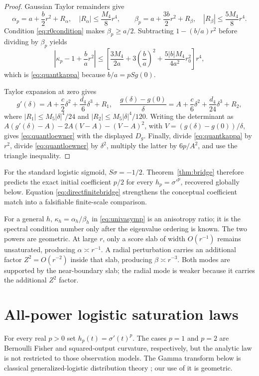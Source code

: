\documentclass[11pt]{article}
\begin{document}
\begin{proof}
Gaussian Taylor remainders give
\[
 \alpha_p=a+\frac b2r^2+R_\alpha,\quad |R_\alpha|\le\frac{M_4}{8}r^4,
 \qquad
 \beta_p=a+\frac{3b}{2}r^2+R_\beta,\quad |R_\beta|\le\frac{5M_4}{8}r^4.
\]
Condition \eqref{eq:r0condition} makes $\beta_p\ge a/2$.  Subtracting
$1-(b/a)r^2$ before dividing by $\beta_p$ yields
\[
 \left|\kappa_p-1+\frac ba r^2\right|
 \le\left[
 \frac{3M_4}{2a}+3\left(\frac ba\right)^2
 +\frac{5|b|M_4}{4a^2}r_0^2\right]r^4,
\]
which is \eqref{eq:quantkappa} because $b/a=pSg(0)$.

Taylor expansion at zero gives
\[
 g'(\delta)=A+\frac c2\delta^2+\frac{d_4}{6}\delta^3+R_1,\quad
 \frac{g(\delta)-g(0)}\delta
 =A+\frac c6\delta^2+\frac{d_4}{24}\delta^3+R_2,
\]
where $|R_1|\le M_5|\delta|^4/24$ and
$|R_2|\le M_5|\delta|^4/120$.  Writing the determinant as
$A(g'(\delta)-A)-2A(V-A)-(V-A)^2$, with
$V=(g(\delta)-g(0))/\delta$, gives \eqref{eq:quantloewner} with the displayed $D_g$.
Finally, divide \eqref{eq:quantkappa} by $r^2$, divide
\eqref{eq:quantloewner} by $\delta^2$, multiply the latter by $6p/A^2$, and use the triangle inequality.
\end{proof}

For the standard logistic sigmoid, $S\sigma=-1/2$.  Theorem~\ref{thm:bridge} therefore predicts the exact initial
coefficient $p/2$ for every $h_p=\sigma'^p$, recovered globally below.  Equation
\eqref{eq:directfinitebridge} strengthens the conceptual coefficient match into a falsifiable finite-scale
comparison.

For a general $h$, $\kappa_h=\alpha_h/\beta_h$ in \eqref{eq:univasymp} is an anisotropy ratio; it is the spectral
condition number only after the eigenvalue ordering is known.  The two powers are geometric.  At large $r$, only a
score slab of width $O(r^{-1})$ remains unsaturated, producing
$\alpha\asymp r^{-1}$.  A radial perturbation carries an additional factor $Z^2=O(r^{-2})$ inside that slab,
producing $\beta\asymp r^{-3}$.  Both modes are supported by the near-boundary slab; the radial mode is weaker
because it carries the additional $Z^2$ factor.

\section{All-power logistic saturation laws}

For every real $p>0$ set $h_p(t)=\sigma'(t)^p$.  The cases $p=1$ and $p=2$ are Bernoulli Fisher and
squared-output curvature, respectively, but the analytic law is not restricted to those observation models.  The
Gamma transform below is classical generalized-logistic distribution theory \cite[eqs.~(2.3)--(2.5)]{ojo2004};
our use of it is geometric.
\end{document}
